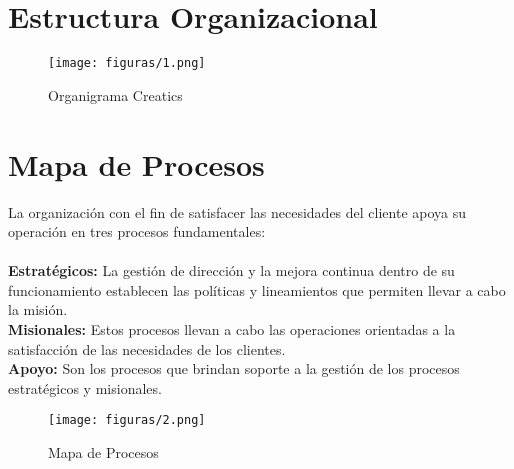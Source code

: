 \section{Estructura Organizacional}
  \begin{figure}[!h]
  	\centering
  	\texttt{[image: figuras/1.png]}
  	\captionsetup{width=.95\textwidth}
  	\caption{Organigrama Creatics}
  	\label{figura1}
  \end{figure}
  
\section{Mapa de Procesos}
  La organización con el fin de satisfacer las necesidades del cliente apoya su operación en tres procesos fundamentales: \\ \\
  \textbf{Estratégicos:} La gestión de dirección y la mejora continua dentro de su funcionamiento establecen las políticas y lineamientos que permiten llevar a cabo la misión. \\
  \textbf{Misionales:} Estos procesos llevan a cabo las operaciones orientadas a la satisfacción de las necesidades de los clientes. \\
  \textbf{Apoyo:} Son los procesos que brindan soporte a la gestión de los procesos estratégicos y misionales.

  \begin{figure}[!h]
  	\centering
  	\texttt{[image: figuras/2.png]}
  	\captionsetup{width=.95\textwidth}
  	\caption{Mapa de Procesos}
  	\label{figura2}
  \end{figure}